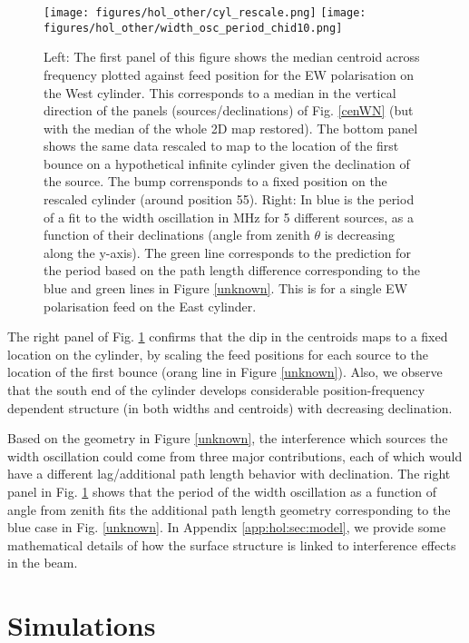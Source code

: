\begin{figure}[h!]
\begin{center}
\texttt{[image: figures/hol\_other/cyl\_rescale.png]}
\texttt{[image: figures/hol\_other/width\_osc\_period\_chid10.png]}
\caption{Left: The first panel of this figure shows the median centroid across frequency plotted against feed position for the EW polarisation on the West cylinder. This corresponds to a median in the vertical direction of the panels (sources/declinations) of Fig. \ref{cenWN} (but with the median of the whole 2D map restored). The bottom panel shows the same data rescaled to map to the location of the first bounce on a hypothetical infinite cylinder given the declination of the source. The bump corrensponds to a fixed position on the rescaled cylinder (around position 55).
\newline
Right: In blue is the period of a fit to the width oscillation in MHz for 5 different sources, as a function of their declinations (angle from zenith $\theta$ is decreasing along the y-axis). The green line corresponds to the prediction for the period based on the path length difference corresponding to the blue and green lines in Figure \ref{unknown}. This is for a single EW polarisation feed on the East cylinder. \label{confirm}}
\end{center}
\end{figure}

The right panel of Fig. \ref{confirm} confirms that the dip in the centroids maps to a fixed location on the cylinder, by scaling the feed positions for each source to the location of the first bounce (orang line in Figure \ref{unknown}). Also, we observe that the south end of the cylinder develops considerable position-frequency dependent structure (in both widths and centroids) with decreasing declination.

Based on the geometry in Figure \ref{unknown}, the interference which sources the width oscillation could come from three major contributions, each of which would have a different lag/additional path length behavior with declination. The right panel in Fig. \ref{confirm} shows that the period of the width oscillation as a function of angle from zenith fits the additional path length geometry corresponding to the blue case in Fig. \ref{unknown}. In Appendix \ref{app:hol:sec:model}, we provide some mathematical details of how the surface structure is linked to interference effects in the beam.

\section{Simulations} \label{ch:hol:sec:sims}

